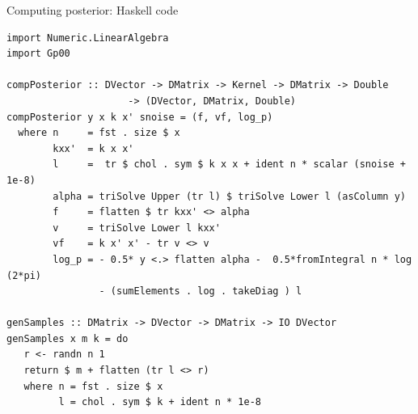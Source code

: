 \documentclass[presentation]{beamer}
\begin{document}
\begin{frame}[fragile,label={sec:org8996b4b}]{Computing posterior: Haskell code}
 \begin{verbatim}
import Numeric.LinearAlgebra
import Gp00

compPosterior :: DVector -> DMatrix -> Kernel -> DMatrix -> Double 
                     -> (DVector, DMatrix, Double)
compPosterior y x k x' snoise = (f, vf, log_p) 
  where n     = fst . size $ x
        kxx'  = k x x'
        l     =  tr $ chol . sym $ k x x + ident n * scalar (snoise + 1e-8)
        alpha = triSolve Upper (tr l) $ triSolve Lower l (asColumn y)
        f     = flatten $ tr kxx' <> alpha
        v     = triSolve Lower l kxx'
        vf    = k x' x' - tr v <> v
        log_p = - 0.5* y <.> flatten alpha -  0.5*fromIntegral n * log (2*pi) 
                - (sumElements . log . takeDiag ) l 

genSamples :: DMatrix -> DVector -> DMatrix -> IO DVector 
genSamples x m k = do
   r <- randn n 1 
   return $ m + flatten (tr l <> r)
   where n = fst . size $ x
         l = chol . sym $ k + ident n * 1e-8
\end{verbatim}
\end{frame}
\end{document}
